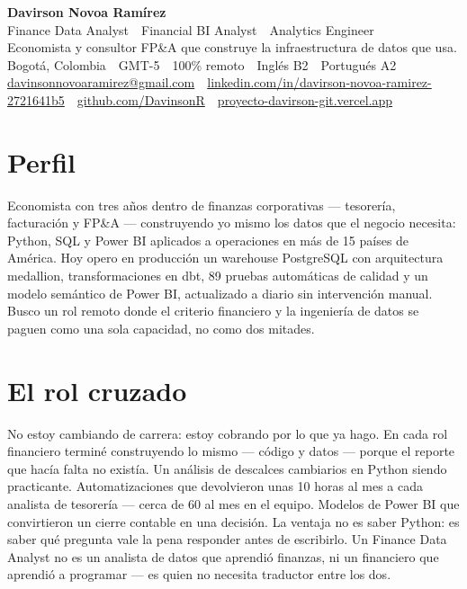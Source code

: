 \documentclass[a4paper,10pt]{article}
\begin{document}
\begin{center}
  {\LARGE\bfseries\color{ink} Davirson Novoa Ramírez}\\[3pt]
  {\large\color{cold} Finance Data Analyst \,\textperiodcentered\, Financial BI Analyst \,\textperiodcentered\, Analytics Engineer}\\[4pt]
  {\small Economista y consultor FP\&A que construye la infraestructura de datos que usa.}\\[3pt]
  {\small Bogotá, Colombia \,\textperiodcentered\, GMT-5 \,\textperiodcentered\, 100\% remoto \,\textperiodcentered\, Inglés B2 \,\textperiodcentered\, Portugués A2}\\[2pt]
  {\small \href{mailto:davinsonnovoaramirez@gmail.com}{davinsonnovoaramirez@gmail.com} \,\textperiodcentered\, \href{https://linkedin.com/in/davirson-novoa-ramirez-2721641b5}{linkedin.com/in/davirson-novoa-ramirez-2721641b5} \,\textperiodcentered\, \href{https://github.com/DavinsonR}{github.com/DavinsonR} \,\textperiodcentered\, \href{https://proyecto-davirson-git.vercel.app/es}{proyecto-davirson-git.vercel.app}}
\end{center}
\vspace{2pt}

\section*{Perfil}
Economista con tres años dentro de finanzas corporativas --- tesorería, facturación y FP\&A --- construyendo yo mismo los datos que el negocio necesita: Python, SQL y Power BI aplicados a operaciones en más de 15 países de América. Hoy opero en producción un warehouse PostgreSQL con arquitectura medallion, transformaciones en dbt, 89 pruebas automáticas de calidad y un modelo semántico de Power BI, actualizado a diario sin intervención manual. Busco un rol remoto donde el criterio financiero y la ingeniería de datos se paguen como una sola capacidad, no como dos mitades.

\section*{El rol cruzado}
No estoy cambiando de carrera: estoy cobrando por lo que ya hago. En cada rol financiero terminé construyendo lo mismo --- código y datos --- porque el reporte que hacía falta no existía. Un análisis de descalces cambiarios en Python siendo practicante. Automatizaciones que devolvieron unas 10 horas al mes a cada analista de tesorería --- cerca de 60 al mes en el equipo. Modelos de Power BI que convirtieron un cierre contable en una decisión. La ventaja no es saber Python: es saber qué pregunta vale la pena responder antes de escribirlo. Un Finance Data Analyst no es un analista de datos que aprendió finanzas, ni un financiero que aprendió a programar --- es quien no necesita traductor entre los dos.
\end{document}
